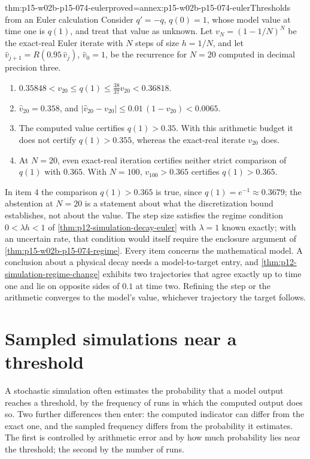 \begin{hbtheorem}{thm:p15-w02b-p15-074-euler}{proved=annex:p15-w02b-p15-074-euler}{Thresholds from an Euler calculation}
Consider \(q'=-q\), \(q(0)=1\), whose model value at time one is
\(q(1)\), and treat that value as unknown. Let \(v_N=(1-1/N)^N\) be the
exact-real Euler iterate with \(N\) steps of size \(h=1/N\), and let
\(\widehat v_{j+1}=R(0.95\,\widehat v_j)\), \(\widehat v_0=1\), be the
recurrence for \(N=20\) computed in decimal precision three.
\begin{enumerate}
\item \(0.35848<v_{20}\leq q(1)\leq\tfrac{38}{37}v_{20}<0.36818\).
\item \(\widehat v_{20}=0.358\), and
\(|\widehat v_{20}-v_{20}|\leq0.01\,(1-v_{20})<0.0065\).
\item The computed value certifies \(q(1)>0.35\). With this arithmetic
budget it does not certify \(q(1)>0.355\), whereas the exact-real iterate
\(v_{20}\) does.
\item At \(N=20\), even exact-real iteration certifies neither strict
comparison of \(q(1)\) with \(0.365\). With \(N=100\), \(v_{100}>0.365\)
certifies \(q(1)>0.365\).
\end{enumerate}
\end{hbtheorem}

In item 4 the comparison \(q(1)>0.365\) is true, since
\(q(1)=e^{-1}\approx0.3679\); the abstention at \(N=20\) is a statement
about what the discretization bound establishes, not about the value. The
step size satisfies the regime condition \(0<\lambda h<1\) of
\cref{thm:p12-simulation-decay-euler} with \(\lambda=1\) known exactly; with an uncertain
rate, that condition would itself require the enclosure argument of
\cref{thm:p15-w02b-p15-074-regime}. Every item concerns the mathematical
model. A conclusion about a physical decay needs a model-to-target entry,
and \cref{thm:p12-simulation-regime-change} exhibits two trajectories that
agree exactly up to time one and lie on opposite sides of \(0.1\) at time
two. Refining the step or the arithmetic converges to the model's value,
whichever trajectory the target follows.

\section{Sampled simulations near a threshold}
\label{sec:p15-w02b-p15-074-sampled}

A stochastic simulation often estimates the probability that a model
output reaches a threshold, by the frequency of runs in which the computed
output does so. Two further differences then enter: the computed indicator
can differ from the exact one, and the sampled frequency differs from the
probability it estimates. The first is controlled by arithmetic error and by
how much probability lies near the threshold; the second by the number of
runs.

